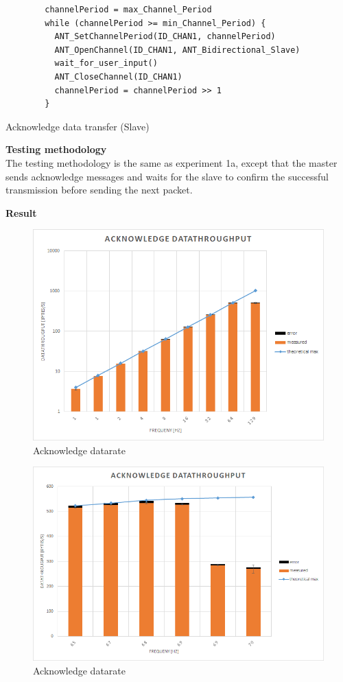 \begin{description}
	\begin{code}[H]
		\begin{verbatim}
		channelPeriod = max_Channel_Period
		while (channelPeriod >= min_Channel_Period) {
		  ANT_SetChannelPeriod(ID_CHAN1, channelPeriod)
		  ANT_OpenChannel(ID_CHAN1, ANT_Bidirectional_Slave)
		  wait_for_user_input()
		  ANT_CloseChannel(ID_CHAN1)
		  channelPeriod = channelPeriod >> 1
		}
		\end{verbatim}
		\caption{Acknowledge data transfer (Slave)}\label{lst:sExp4}
	\end{code}
	\item{\textbf{Testing methodology}} \hfill \\ The testing methodology is the same as experiment 1a, except that the master sends acknowledge messages and waits for the slave to confirm the successful transmission before sending the next packet. 
	\item{\textbf{Result}} \hfill \\
	\begin{figure}[H]
		\centering
		\includegraphics[scale=0.5]{./pics/exp4_norm.png}
		\caption{Acknowledge datarate}\label{fig:exp4norm}
	\end{figure}
	\begin{figure}[H]
		\centering
		\includegraphics[scale=0.5]{./pics/exp4_detail.png}
		\caption{Acknowledge datarate}\label{fig:exp4between}
	\end{figure}
	

\end{description}

